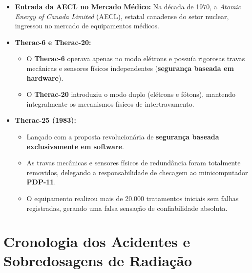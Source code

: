\documentclass[12pt, a4paper]{article}
\begin{document}
\begin{itemize}
    \item \textbf{Entrada da AECL no Mercado Médico:} Na década de 1970, a \textit{Atomic Energy of Canada Limited} (AECL), estatal canadense do setor nuclear, ingressou no mercado de equipamentos médicos.
    \item \textbf{Therac-6 e Therac-20:}
    \begin{itemize}
        \item O \textbf{Therac-6} operava apenas no modo elétrons e possuía rigorosas travas mecânicas e sensores físicos independentes (\textbf{segurança baseada em hardware}).
        \item O \textbf{Therac-20} introduziu o modo duplo (elétrons e fótons), mantendo integralmente os mecanismos físicos de intertravamento.
    \end{itemize}
    \item \textbf{Therac-25 (1983):}
    \begin{itemize}
        \item Lançado com a proposta revolucionária de \textbf{segurança baseada exclusivamente em software}.
        \item As travas mecânicas e sensores físicos de redundância foram totalmente removidos, delegando a responsabilidade de checagem ao minicomputador \textbf{PDP-11}.
        \item O equipamento realizou mais de 20.000 tratamentos iniciais sem falhas registradas, gerando uma falsa sensação de confiabilidade absoluta.
    \end{itemize}
\end{itemize}

\section{Cronologia dos Acidentes e Sobredosagens de Radiação}
\end{document}

